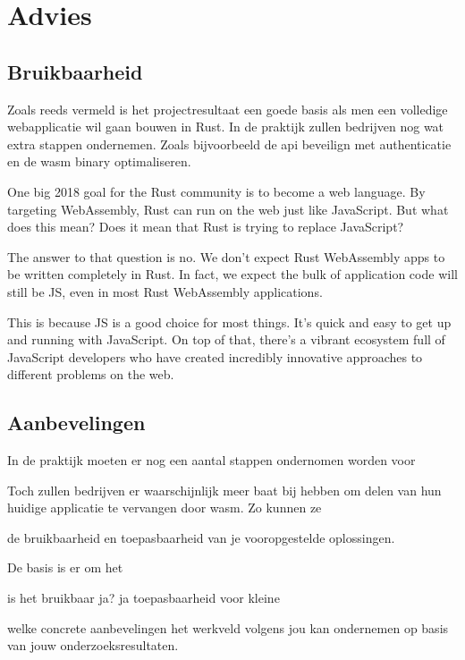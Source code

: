 \chapter{Advies}

\section{Bruikbaarheid}

Zoals reeds vermeld is het projectresultaat een goede basis als men een volledige webapplicatie wil
gaan bouwen in Rust. In de praktijk zullen bedrijven nog wat extra stappen ondernemen. Zoals
bijvoorbeeld de api beveilign met authenticatie en de wasm binary optimaliseren.

One big 2018 goal for the Rust community is to become a web language. By targeting WebAssembly, Rust
can run on the web just like JavaScript. But what does this mean? Does it mean that Rust is trying
to replace JavaScript?

The answer to that question is no. We don’t expect Rust WebAssembly apps to be written completely in
Rust. In fact, we expect the bulk of application code will still be JS, even in most Rust
WebAssembly applications.

This is because JS is a good choice for most things. It’s quick and easy to get up and running with
JavaScript. On top of that, there’s a vibrant ecosystem full of JavaScript developers who have
created incredibly innovative approaches to different problems on the web.


\section{Aanbevelingen}



In de praktijk moeten er nog een aantal stappen ondernomen worden voor 

Toch zullen bedrijven er waarschijnlijk meer baat bij hebben om delen van hun huidige applicatie te
vervangen door wasm. Zo kunnen ze 



de bruikbaarheid en toepasbaarheid van je vooropgestelde oplossingen.

De basis is er om het 


is het bruikbaar ja? ja
toepasbaarheid voor kleine  

welke concrete aanbevelingen het werkveld volgens jou kan ondernemen op basis van jouw onderzoeksresultaten.

